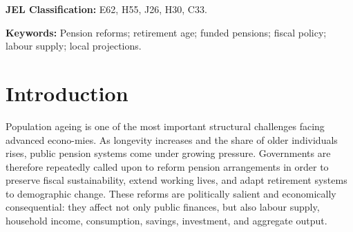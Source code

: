 \documentclass[11pt,english,a4paper, twoside, authoryear]{article}
\begin{document}
\begin{abstract}
\begin{spacing}{1.1}
This paper studies the macroeconomic effects of pension reforms in advanced economies. We build a new narrative database of major pension reforms in 17 OECD countries over 1980-2025, recording their timing, magnitude, and phase-in across retirement ages, early-retirement rules, contribution requirements, and private pillars. A conditional factor analysis extracts two orthogonal reform dimensions: an \emph{Age} factor (delayed retirement) and a \emph{Capitalisation} factor (a financing-related dimension associated with funded schemes). Local projections show that retirement-age reforms are broadly expansionary: they raise older workers' participation, actual and potential GDP, consumption, and investment, while lowering pension expenditure and public debt ratios. They act as positive labour-supply shocks rather than fiscal retrenchments. By contrast, based on fewer episodes, we find suggestive evidence that the \emph{Capitalisation} factor is associated with persistent declines in GDP, consumption, investment, GDP per worker, and higher debt ratios, consistent with transition costs and demand compression outweighing capital-accumulation effects over the medium run. Overall, the instrument matters: delaying retirement can improve both growth and fiscal sustainability, whereas shifting to funded schemes does not appear to deliver macroeconomic gains within ten years.
\end{spacing}
\end{abstract}

\noindent \textbf{JEL Classification:} E62, H55, J26, H30, C33. \

\noindent \textbf{Keywords:} Pension reforms; retirement age; funded pensions; fiscal policy; labour supply; local projections.

\thispagestyle{empty}

\newpage

\section{Introduction}

Population ageing is one of the most important structural challenges facing advanced econo-mies. As longevity increases and the share of older individuals rises, public pension systems come under growing pressure. Governments are therefore repeatedly called upon to reform pension arrangements in order to preserve fiscal sustainability, extend working lives, and adapt retirement systems to demographic change. These reforms are politically salient and economically consequential: they affect not only public finances, but also labour supply, household income, consumption, savings, investment, and aggregate output.
\end{document}
